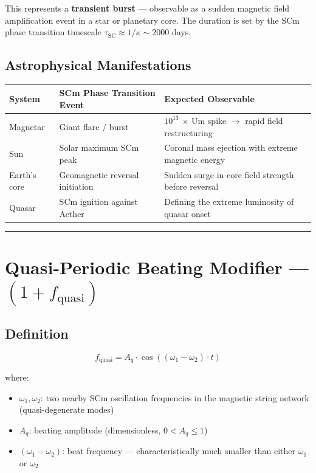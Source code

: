 \documentclass[12pt,a4paper]{article}
\begin{document}
This represents a \textbf{transient burst} --- observable as a sudden magnetic field amplification event in a star or planetary core. The duration is set by the SCm phase transition timescale $\tau_{\text{SC}} \approx 1/\kappa \sim 2000$ days.

\subsection{Astrophysical Manifestations}

\begin{table}[H]
\centering
\small
\begin{tabularx}{\linewidth}{@{}>{\raggedright\arraybackslash}X>{\raggedright\arraybackslash}X>{\raggedright\arraybackslash}X@{}}
\toprule
System & SCm Phase Transition Event & Expected Observable \tabularnewline
\midrule
Magnetar & Giant flare / burst & $10^{13}$ $\times$ Um spike $\to$ rapid field restructuring \tabularnewline
Sun & Solar maximum SCm peak & Coronal mass ejection with extreme magnetic energy \tabularnewline
Earth's core & Geomagnetic reversal initiation & Sudden surge in core field strength before reversal \tabularnewline
Quasar & SCm ignition against Aether & Defining the extreme luminosity of quasar onset \tabularnewline
\bottomrule
\end{tabularx}
\end{table}

\medskip\hrule\medskip

\section{Quasi-Periodic Beating Modifier --- $(1 + f_{\text{quasi}})$}

\subsection{Definition}

\begin{equation}
f_{\text{quasi}} = A_q \cdot \cos\!\left((\omega_1 - \omega_2) \cdot t\right)
\end{equation}

where:

\begin{itemize}
  \item $\omega_1, \omega_2$: two nearby SCm oscillation frequencies in the magnetic string network (quasi-degenerate modes)
  \item $A_q$: beating amplitude (dimensionless, $0 < A_q \leq 1$)
  \item $(\omega_1 - \omega_2)$: beat frequency --- characteristically much smaller than either $\omega_1$ or $\omega_2$
\end{itemize}
\end{document}
